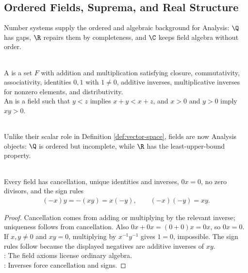 \subsection{Ordered Fields, Suprema, and Real Structure}

%


Number systems supply the ordered and algebraic background for Analysis: $\Q$ has gaps, $\R$ repairs them by completeness, and $\C$ keeps field algebra without order.

\begin{definition} \label{def:field-and-ordered-field-analysis} \\
A  is a set $F$ with addition and multiplication satisfying closure, commutativity, associativity, identities $0,1$ with $1\neq0$, additive inverses, multiplicative inverses for nonzero elements, and distributivity.\\
An  is a field such that $y<z$ implies $x+y<x+z$, and $x>0$ and $y>0$ imply $xy>0$.
\end{definition}

\begin{remark} \label{rem:fields-as-analysis-objects-and-linear-scalars} \\
Unlike their scalar role in Definition \ref{def:vector-space}, fields are now Analysis objects: $\Q$ is ordered but incomplete, while $\R$ has the least-upper-bound property.
\end{remark}

\begin{proposition} \label{prop:field-axiom-consequences-analysis} \\
Every field has cancellation, unique identities and inverses, $0x=0$, no zero divisors, and the sign rules
\begin{align}
(-x)y=-(xy)=x(-y),\qquad (-x)(-y)=xy. \nonumber
\end{align}
\begin{proof}
Cancellation comes from adding or multiplying by the relevant inverse; uniqueness follows from cancellation. Also $0x+0x=(0+0)x=0x$, so $0x=0$. If $x,y\neq0$ and $xy=0$, multiplying by $x^{-1}y^{-1}$ gives $1=0$, impossible. The sign rules follow because the displayed negatives are additive inverses of $xy$.\\
: The field axioms license ordinary algebra.\\
: Inverses force cancellation and signs.
\end{proof}
\end{proposition}

